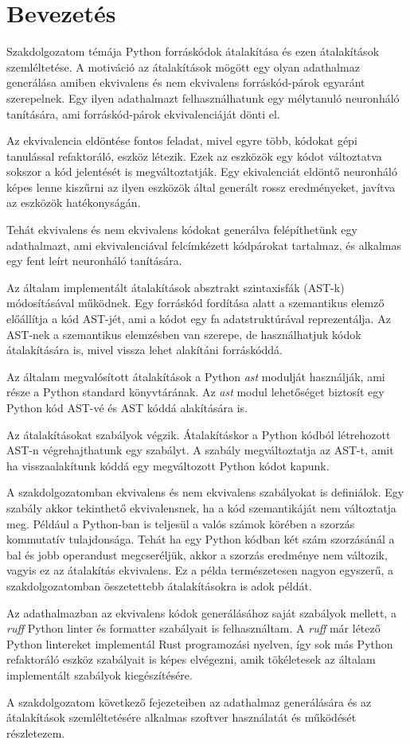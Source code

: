 \chapter{Bevezetés}
\label{ch:intro}

Szakdolgozatom témája Python forráskódok átalakítása és ezen átalakítások szemléltetése.
A motiváció az átalakítások mögött egy olyan adathalmaz generálása amiben ekvivalens és nem
ekvivalens 
forráskód-párok egyaránt szerepelnek. Egy ilyen adathalmazt felhasználhatunk egy mélytanuló
neuronháló tanítására,
ami forráskód-párok ekvivalenciáját dönti el.

Az ekvivalencia eldöntése fontos feladat, mivel egyre több, kódokat gépi tanulással refaktoráló,
eszköz létezik.
Ezek az eszközök egy kódot változtatva sokszor a kód jelentését is megváltoztatják.
Egy ekivalenciát eldöntő neuronháló képes lenne kiszűrni az ilyen eszközök által generált
rossz eredményeket, javítva az eszközök hatékonyságán.

Tehát ekvivalens és nem ekvivalens kódokat generálva felépíthetünk egy adathalmazt, ami
ekvivalenciával felcímkézett kódpárokat tartalmaz, és alkalmas egy fent leírt neuronháló
tanítására.

Az általam implementált átalakítások absztrakt szintaxisfák (AST-k) módosításával működnek.
Egy forráskód fordítása alatt a szemantikus elemző előállítja a kód AST-jét,
ami a kódot egy fa adatstruktúrával reprezentálja.
Az AST-nek a szemantikus elemzésben van szerepe,
de használhatjuk kódok átalakítására is, mivel vissza lehet alakítáni forráskóddá.

Az általam megvalósított átalakítások a Python \emph{ast} modulját használják,
ami része a Python standard könyvtárának.
Az \emph{ast} modul lehetőséget biztosít egy Python kód AST-vé és AST kóddá alakítására is.

\pagebreak

Az átalakításokat szabályok végzik. Átalakításkor 
a Python kódból létrehozott AST-n végrehajthatunk egy szabályt.
A szabály megváltoztatja az AST-t, amit ha visszaalakítunk kóddá
egy megváltozott Python kódot kapunk.

A szakdolgozatomban ekvivalens és nem ekvivalens szabályokat is definiálok.
Egy szabály akkor tekinthető ekvivalensnek, ha a kód szemantikáját nem változtatja meg.
Például a Python-ban is teljesül a valós számok körében a szorzás kommutatív tulajdonsága.
Tehát ha egy Python kódban két szám szorzásánál a bal és jobb operandust megcseréljük,
akkor a szorzás eredménye nem változik, vagyis ez az átalakítás ekvivalens.
Ez a példa természetesen nagyon egyszerű, a szakdolgozatomban összetettebb átalakításokra is
adok példát.

Az adathalmazban az ekvivalens kódok generálásához saját szabályok mellett,
a \emph{ruff} Python linter és formatter szabályait is felhasználtam.
A \emph{ruff} már létező Python lintereket implementál Rust programozási nyelven,
így sok más Python refaktoráló eszköz szabályait is képes elvégezni,
amik tökéletesek az általam implementált szabályok kiegészítésére.

A szakdolgozatom következő fejezeteiben az adathalmaz generálására és az átalakítások
szemléltetésére alkalmas szoftver használatát és működését részletezem.
